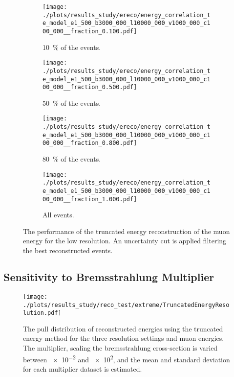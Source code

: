 \begin{figure}[H]
    \centering
    \begin{subfigure}{0.48\textwidth}
        \centering
        \texttt{[image: ./plots/results\_study/ereco/energy\_correlation\_te\_model\_e1\_500\_b3000\_000\_l10000\_000\_v1000\_000\_c100\_000\_\_fraction\_0.100.pdf]}
        \caption{\SI{10}{\%} of the events.}
        \label{fig:study_ereco_te_low_perform_0.1}
    \end{subfigure}
    \hfill
    \begin{subfigure}{0.48\textwidth}
        \centering
        \texttt{[image: ./plots/results\_study/ereco/energy\_correlation\_te\_model\_e1\_500\_b3000\_000\_l10000\_000\_v1000\_000\_c100\_000\_\_fraction\_0.500.pdf]}
        \caption{\SI{50}{\%} of the events.}
        \label{fig:study_ereco_te_low_perform_0.5}
    \end{subfigure}
    \begin{subfigure}{0.48\textwidth}
        \vspace{0.5cm}
        \centering
        \texttt{[image: ./plots/results\_study/ereco/energy\_correlation\_te\_model\_e1\_500\_b3000\_000\_l10000\_000\_v1000\_000\_c100\_000\_\_fraction\_0.800.pdf]}
        \caption{\SI{80}{\%} of the events.}
        \label{fig:study_ereco_te_low_perform_0.8}
    \end{subfigure}
    \hfill
    \begin{subfigure}{0.48\textwidth}
        \vspace{0.5cm}
        \centering
        \texttt{[image: ./plots/results\_study/ereco/energy\_correlation\_te\_model\_e1\_500\_b3000\_000\_l10000\_000\_v1000\_000\_c100\_000\_\_fraction\_1.000.pdf]}
        \caption{All events.}
        \label{fig:study_ereco_te_low_perform_1.0}
    \end{subfigure}
    \caption{The performance of the truncated energy reconstruction of the muon energy for the low resolution. An uncertainty cut is applied filtering the best reconstructed events.}
    \label{fig:study_ereco_te_low_perform}
\end{figure}

%

\subsection{Sensitivity to Bremsstrahlung Multiplier} \label{sec:study_pull_dist}

\begin{figure}[H]
    \centering
    \texttt{[image: ./plots/results\_study/reco\_test/extreme/TruncatedEnergyResolution.pdf]}
    \caption{The pull distribution of reconstructed energies using the truncated energy method for the three resolution settings and muon energies. The multiplier, scaling the bremsstrahlung cross-section is varied between \num{e-2} and \num{e2}, and the mean and standard deviation for each multiplier dataset is estimated.}
    \label{fig:study_ereco_pull_te_extreme}
\end{figure}


